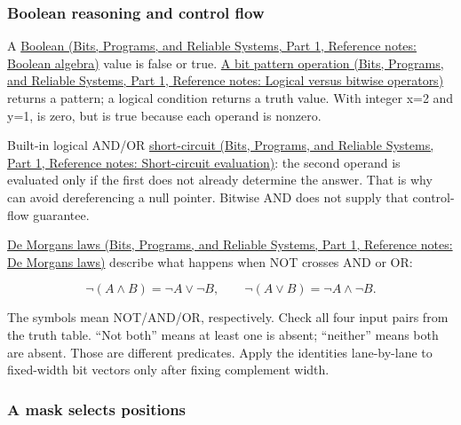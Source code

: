 \subsubsection{Boolean reasoning and control flow}\label{05-engine-i-ch001-boolean-reasoning-and-control-flow}

\hypertarget{05-engine-i-ch001-boolean-reasoning-and-control-flow}{}

A \href{../01-Bits-Programs-and-Reliable-Systems-P01/main.pdf\#nameddest=appendix-24475e1596a8}{Boolean (Bits, Programs, and Reliable Systems, Part 1, Reference notes: Boolean algebra)} value is false or true. \href{../01-Bits-Programs-and-Reliable-Systems-P01/main.pdf\#nameddest=appendix-fe6b457d68d8}{A bit pattern operation (Bits, Programs, and Reliable Systems, Part 1, Reference notes: Logical versus bitwise operators)} returns a pattern; a logical condition returns a truth value. With integer x=2 and y=1,  is zero, but  is true because each operand is nonzero.

Built-in logical AND/OR \href{../01-Bits-Programs-and-Reliable-Systems-P01/main.pdf\#nameddest=appendix-2e245a6fa8d3}{short-circuit (Bits, Programs, and Reliable Systems, Part 1, Reference notes: Short-circuit evaluation)}: the second operand is evaluated only if the first does not already determine the answer. That is why  can avoid dereferencing a null pointer. Bitwise AND does not supply that control-flow guarantee.

\href{../01-Bits-Programs-and-Reliable-Systems-P01/main.pdf\#nameddest=appendix-9079d3659da4}{De Morgan\textquotesingle s laws (Bits, Programs, and Reliable Systems, Part 1, Reference notes: De Morgan\textquotesingle s laws)} describe what happens when NOT crosses AND or OR:

\[
\neg(A\land B)=\neg A\lor\neg B,\qquad
\neg(A\lor B)=\neg A\land\neg B.
\]

The symbols mean NOT/AND/OR, respectively. Check all four input pairs from the truth table. ``Not both'' means at least one is absent; ``neither'' means both are absent. Those are different predicates. Apply the identities lane-by-lane to fixed-width bit vectors only after fixing complement width.

\subsubsection{A mask selects positions}\label{05-engine-i-ch001-a-mask-selects-positions}

